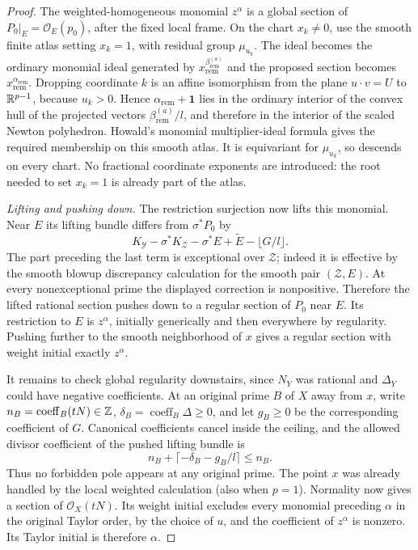 \begin{proof}
The weighted-homogeneous monomial $z^\alpha$ is a global section of
$P_0|_E=\mathcal O_E(p_0)$, after the fixed local frame.  On the chart
$x_k\ne0$, use the smooth finite atlas setting $x_k=1$, with residual
group $\mu_{u_k}$.  The ideal becomes the ordinary monomial ideal
generated by $x_{\mathrm{rem}}^{\beta^{(a)}_{\mathrm{rem}}}$ and the
proposed section becomes $x_{\mathrm{rem}}^{\alpha_{\mathrm{rem}}}$.
Dropping coordinate $k$ is an affine isomorphism from the plane
$u\cdot v=U$ to $\mathbb R^{p-1}$, because $u_k>0$.  Hence
$\alpha_{\mathrm{rem}}+\mathbf1$ lies in the ordinary interior of
the convex hull of the projected vectors $\beta^{(a)}_{\mathrm{rem}}/l$,
and therefore in the interior of the scaled Newton polyhedron.
Howald's monomial multiplier-ideal formula \cite[Main Theorem]{Howald}
gives the required membership
on this smooth atlas.  It is equivariant for $\mu_{u_k}$, so descends
on every chart.  No fractional coordinate exponents are introduced:
the root needed to set $x_k=1$ is already part of the atlas.

\medskip
\noindent\emph{Lifting and pushing down.}
The restriction surjection now lifts this monomial.  Near $E$ its
lifting bundle differs from $\sigma^*P_0$ by
\[
 K_{\mathcal Y}-\sigma^*K_{\mathcal Z}
  -\sigma^*E+\widetilde E-\lfloor G/l\rfloor.
\]
The part preceding the last term is exceptional over $\mathcal Z$;
indeed it is effective by the smooth blowup discrepancy calculation
for the smooth pair $(\mathcal Z,E)$.  At every nonexceptional prime
the displayed correction is nonpositive.  Therefore the lifted
rational section pushes down to a regular section of $P_0$ near $E$.
Its restriction to $E$ is $z^\alpha$, initially generically and then
everywhere by regularity.  Pushing further to the smooth neighborhood
of $x$ gives a regular section with weight initial exactly $z^\alpha$.

It remains to check global regularity downstairs, since $N_Y$ was
rational and $\Delta_Y$ could have negative coefficients.  At an
original prime $B$ of $X$ away from $x$, write
$n_B=\operatorname{coeff}_B(tN)\in\mathbb Z$,
$\delta_B=\operatorname{coeff}_B\Delta\ge0$, and let $g_B\ge0$ be
the corresponding coefficient of $G$.  Canonical coefficients cancel
inside the ceiling, and the allowed divisor coefficient of the
pushed lifting bundle is
\[
 n_B+\lceil-\delta_B-g_B/l\rceil\le n_B.
\]
Thus no forbidden pole appears at any original prime.  The point
$x$ was already handled by the local weighted calculation (also when
$p=1$).  Normality now gives a section of $\mathcal O_X(tN)$.
Its weight initial excludes every monomial preceding $\alpha$ in
the original Taylor order, by the choice of $u$, and the coefficient
of $z^\alpha$ is nonzero.  Its Taylor initial is therefore $\alpha$.
\end{proof}

